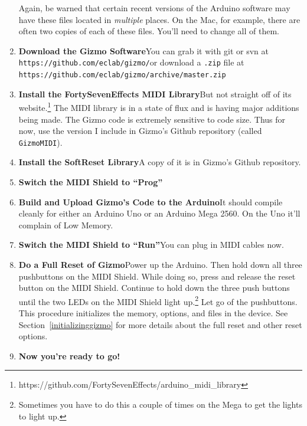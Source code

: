 \documentclass{article}
\begin{document}
\begin{enumerate}
{Again, be warned that certain recent versions of the Arduino software may have these files located in {\it multiple} places.  On the Mac, for example, there are often two copies of each of these files. You'll need to change all of them.
}


\item {\bf Download the Gizmo Software}\quad You can grab it with git or svn at\\
\texttt{https:/\!/github.com/eclab/gizmo/}\quad or download a \texttt{.zip} file at\\
\texttt{https:/\!/github.com/eclab/gizmo/archive/master.zip}

\item {\bf Install the FortySevenEffects MIDI Library}\quad But not straight off of its website.\footnote{https:/\!/github.com/FortySevenEffects/arduino\_midi\_library}  The MIDI library is in a state of flux and is having major additions being made.  The Gizmo code is extremely sensitive to code size.  Thus for now, use the version I include in Gizmo's Github repository (called {\tt GizmoMIDI}).

\item {\bf Install the SoftReset Library}\quad A copy of it is in Gizmo's Github repository.

\item {\bf Switch the MIDI Shield to ``Prog''}

\item {\bf Build and Upload Gizmo's Code to the Arduino}\quad  It should compile cleanly for either an Arduino Uno or an Arduino Mega 2560.  On the Uno it'll complain of Low Memory.

\item {\bf Switch the MIDI Shield to ``Run''}\quad  You can plug in MIDI cables now.

\item {\bf Do a Full Reset of Gizmo}\quad Power up the Arduino.  Then hold down all three pushbuttons on the MIDI Shield.  While doing so, press and release the reset button on the MIDI Shield.  Continue to hold down the three push buttons until the two LEDs on the MIDI Shield light up.\footnote{Sometimes you have to do this a couple of times on the Mega to get the lights to light up.}  Let go of the pushbuttons.  This procedure initializes the memory, options, and files in the device.  See Section~\ref{initializinggizmo} for more details about the full reset and other reset options.  

\item {\bf Now you're ready to go!}

\end{enumerate}
\end{document}
